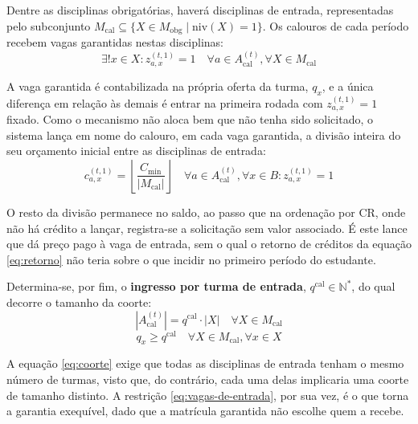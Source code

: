 \documentclass[
    12pt,
    openany,
    oneside,
    a4paper,
    english,
    brazil
]{abntex2}
\begin{document}
Dentre as disciplinas obrigatórias, haverá disciplinas de entrada, representadas pelo subconjunto $M_\text{cal} \subseteq \{X \in M_\text{obg} \mid \mathrm{niv}(X) = 1\}$. Os calouros de cada período recebem vagas garantidas nestas disciplinas:
\begin{equation}
    \exists! x \in X : z^{(t, 1)}_{a, x} = 1
    \quad \forall a \in A^{(t)}_\text{cal}, \forall  X \in M_\text{cal}
\end{equation}

A vaga garantida é contabilizada na própria oferta da turma, $q_x$, e a única diferença em relação às demais é entrar na primeira rodada com $z^{(t, 1)}_{a, x} = 1$ fixado. Como o mecanismo não aloca bem que não tenha sido solicitado, o sistema lança em nome do calouro, em cada vaga garantida, a divisão inteira do seu orçamento inicial entre as disciplinas de entrada:
\begin{equation} \label{eq:lance-de-entrada}
    c_{a, x}^{(t, 1)} = \left\lfloor \frac{C_{\min}}{\left| M_\text{cal} \right|} \right\rfloor
    \quad \forall a \in A^{(t)}_\text{cal},
    \forall x \in B : z^{(t, 1)}_{a, x} = 1
\end{equation}

O resto da divisão permanece no saldo, ao passo que na ordenação por CR, onde não há crédito a lançar, registra-se a solicitação sem valor associado. É este lance que dá preço pago à vaga de entrada, sem o qual o retorno de créditos da equação \eqref{eq:retorno} não teria sobre o que incidir no primeiro período do estudante.

Determina-se, por fim, o \textbf{ingresso por turma de entrada}, $q^\text{cal} \in \mathbb{N}^*$, do qual decorre o tamanho da coorte:
\begin{equation} \label{eq:coorte}
    \left| A^{(t)}_\text{cal} \right| = q^\text{cal} \cdot \left| X \right|
    \quad \forall X \in M_\text{cal}
\end{equation}
\begin{equation} \label{eq:vagas-de-entrada}
    q_x \geq q^\text{cal}
    \quad \forall X \in M_\text{cal}, \forall x \in X
\end{equation}

A equação \eqref{eq:coorte} exige que todas as disciplinas de entrada tenham o mesmo número de turmas, visto que, do contrário, cada uma delas implicaria uma coorte de tamanho distinto. A restrição \eqref{eq:vagas-de-entrada}, por sua vez, é o que torna a garantia exequível, dado que a matrícula garantida não escolhe quem a recebe.
\end{document}

